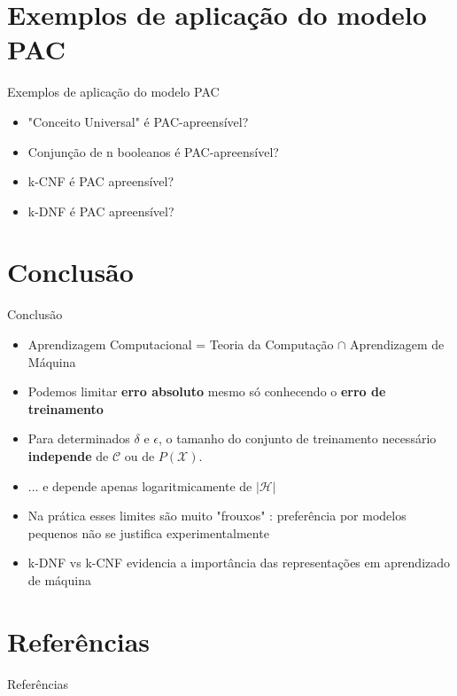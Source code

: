 \documentclass[10pt, professionalfonts]{beamer}
\begin{document}
{

  \AtBeginSection{}
\section{Exemplos de aplicação do modelo PAC}
\begin{frame}{Exemplos de aplicação do modelo PAC}
  \begin{itemize}[<+->]
    \item "Conceito Universal" é PAC-apreensível?
    \item Conjunção de n booleanos é PAC-apreensível?
    \item k-CNF é PAC apreensível?
    \item k-DNF é PAC apreensível?
    \end{itemize}
\end{frame}
}
{

  \AtBeginSection{}
\section{Conclusão}
\begin{frame}{Conclusão}
  \begin{itemize}[<+->]
    \item Aprendizagem Computacional = Teoria da Computação $\cap$  Aprendizagem de Máquina
    \item Podemos limitar \textbf{erro absoluto} mesmo só conhecendo o \textbf{erro de treinamento}
    \item Para determinados $\delta$ e $\epsilon$, o tamanho do conjunto de treinamento necessário \textbf{independe} de $\mathcal{C}$ ou  de $P(\mathcal{X})$.
    \item ... e depende apenas logaritmicamente de $|\mathcal{H}|$
    \item Na prática esses limites são muito "frouxos" \cite{MitchelPAC}: preferência por modelos pequenos não se justifica experimentalmente
    \item  k-DNF vs k-CNF evidencia a importância das representações em aprendizado de máquina
    \end{itemize}
\end{frame}
}
{

  \AtBeginSection{}
\section{Referências}
\begin{frame}[allowframebreaks]{Referências}

  
  

\end{frame}
}
\end{document}
